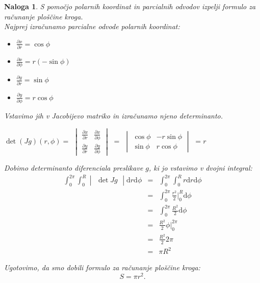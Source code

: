 \documentclass[12pt, a4paper]{article}
\newtheorem{naloga}{Naloga}
\begin{document}
\begin{naloga}
S pomočjo polarnih koordinat in parcialnih odvodov izpelji formulo za računanje ploščine kroga. \\
\emph
{Najprej izračunamo parcialne odvode polarnih koordinat:}

\begin{itemize}
\item $\frac{\partial x}{\partial r}= \cos \phi$
\item $\frac{\partial x}{\partial \phi}= r  (-\sin \phi)$
\item $\frac{\partial y}{\partial r}= \sin \phi$
\item $\frac{\partial y}{\partial \phi}= r  \cos \phi$ \\
\end{itemize}
\emph
{Vstavimo jih v Jacobijevo matriko in izračunamo njeno determinanto.}
\\
\begin{center}
 {
$\det (Jg)(r,\phi)=$ \large $ \begin{vmatrix} \frac{\partial x}{\partial r}  &  \frac{\partial x}{\partial \phi}  \\  \frac{\partial y}{\partial r}  &  \frac{\partial y}{\partial \phi}  \end{vmatrix} $ $=$ \normalsize $\begin{vmatrix} \cos \phi & -r \sin \phi \\ \sin \phi & r \cos \phi \end{vmatrix} $  $= r$
}
\end{center}

\emph
{Dobimo determinanto diferenciala preslikave $g$, ki jo vstavimo v dvojni integral:}
\begin{eqnarray*}
\int^{2\pi}_{0} \int^{R}_{0}   \begin{vmatrix} \det Jg \end{vmatrix}  \mathrm{d} r \mathrm{d}\phi &=&  \int^{2\pi}_{0} \int^{R}_{0}  r \mathrm{d} r \mathrm{d}\phi \\
 &=&  \int^{2\pi}_{0} \frac{r^2}{2} \big|^{R}_{0} \mathrm{d}\phi \\
 &=&  \int^{2\pi}_{0} \frac{R^2}{2} \mathrm{d}\phi \\
 &=&  \frac{R^2}{2} \phi  \big|^{2\pi}_{0} \\
 &=&  \frac{R^2}{2} 2\pi \\
 &=&  \pi R^2
\end{eqnarray*}

\emph
{Ugotovimo, da smo dobili formulo za računanje ploščine kroga:}
$$
S=\pi r^2 .
$$
\end{naloga}
\end{document}
